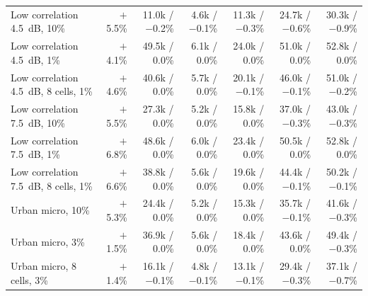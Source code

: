 \documentclass[acmsmall,screen,review,anonymous]{acmart}
\begin{document}
\begin{table}[t]
\begin{tabular}{@{}lrrrrrr@{}}
Low correlation 4.5~dB, 10\% & $+$5.5\% & 11.0k / $-$0.2\% & 4.6k / $-$0.1\% & 11.3k / $-$0.3\% & 24.7k / $-$0.6\% & 30.3k / $-$0.9\% \\
Low correlation 4.5~dB, 1\% & $+$4.1\% & 49.5k / 0.0\% & 6.1k / 0.0\% & 24.0k / 0.0\% & 51.0k / 0.0\% & 52.8k / 0.0\% \\
Low correlation 4.5~dB, 8 cells, 1\% & $+$4.6\% & 40.6k / 0.0\% & 5.7k / 0.0\% & 20.1k / $-$0.1\% & 46.0k / $-$0.1\% & 51.0k / $-$0.2\% \\
Low correlation 7.5~dB, 10\% & $+$5.5\% & 27.3k / 0.0\% & 5.2k / 0.0\% & 15.8k / 0.0\% & 37.0k / $-$0.3\% & 43.0k / $-$0.3\% \\
Low correlation 7.5~dB, 1\% & $+$6.8\% & 48.6k / 0.0\% & 6.0k / 0.0\% & 23.4k / 0.0\% & 50.5k / 0.0\% & 52.8k / 0.0\% \\
Low correlation 7.5~dB, 8 cells, 1\% & $+$6.6\% & 38.8k / 0.0\% & 5.6k / 0.0\% & 19.6k / 0.0\% & 44.4k / $-$0.1\% & 50.2k / $-$0.1\% \\
Urban micro, 10\% & $+$5.3\% & 24.4k / 0.0\% & 5.2k / 0.0\% & 15.3k / 0.0\% & 35.7k / $-$0.1\% & 41.6k / $-$0.3\% \\
Urban micro, 3\% & $+$1.5\% & 36.9k / 0.0\% & 5.6k / 0.0\% & 18.4k / 0.0\% & 43.6k / 0.0\% & 49.4k / $-$0.3\% \\
Urban micro, 8 cells, 3\% & $+$1.4\% & 16.1k / $-$0.1\% & 4.8k / $-$0.1\% & 13.1k / $-$0.1\% & 29.4k / $-$0.3\% & 37.1k / $-$0.7\% \\
\bottomrule
\end{tabular}
\end{table}
\end{document}
